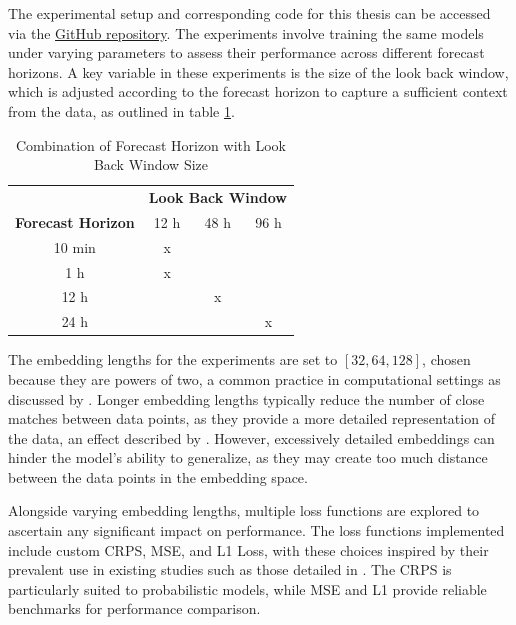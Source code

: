 \documentclass{article}
\begin{document}
The experimental setup and corresponding code for this thesis can be accessed via the \href{https://github.com/janbesler/Masterarbeit}{GitHub repository}. The experiments involve training the same models under varying parameters to assess their performance across different forecast horizons. A key variable in these experiments is the size of the look back window, which is adjusted according to the forecast horizon to capture a sufficient context from the data, as outlined in table \ref{tab:forecast-lookback}.

\begin{table}[h!]
  \begin{center}
    \caption{Combination of Forecast Horizon with Look Back Window Size}
    \begin{tabular}{c|c|c|c}
      \toprule
       & \multicolumn{3}{c}{\textbf{Look Back Window}} \\
      \textbf{Forecast Horizon} & 12 h & 48 h & 96 h \\
      \midrule
      10 min & x & & \\
      1 h & x & & \\
      12 h & & x & \\
      24 h & & & x \\
      \bottomrule
    \end{tabular}
    \label{tab:forecast-lookback}
  \end{center}
\end{table}

The embedding lengths for the experiments are set to $[32, 64, 128]$, chosen because they are powers of two, a common practice in computational settings as discussed by \cite{optimal_embedding_length}. Longer embedding lengths typically reduce the number of close matches between data points, as they provide a more detailed representation of the data, an effect described by \cite{introduction_embeddings}. However, excessively detailed embeddings can hinder the model's ability to generalize, as they may create too much distance between the data points in the embedding space.

Alongside varying embedding lengths, multiple loss functions are explored to ascertain any significant impact on performance. The loss functions implemented include custom CRPS, MSE, and L1 Loss, with these choices inspired by their prevalent use in existing studies such as those detailed in \cite{Informer, autoformer, cross-entropy_time-series}. The CRPS is particularly suited to probabilistic models, while MSE and L1 provide reliable benchmarks for performance comparison.
\end{document}
